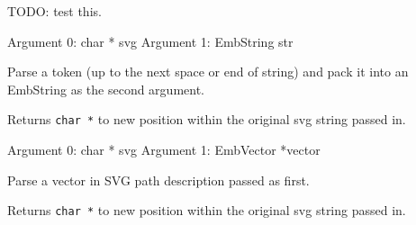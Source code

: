 
TODO: test this.

Argument 0: char * svg
Argument 1: EmbString str

Parse a token (up to the next space or end of string) and pack it into
an EmbString as the second argument.

Returns \texttt{char *} to new position within the original svg string passed in.


Argument 0: char * svg
Argument 1: EmbVector *vector

Parse a vector in SVG path description passed as first.

Returns \texttt{char *} to new position within the original svg string passed in.

